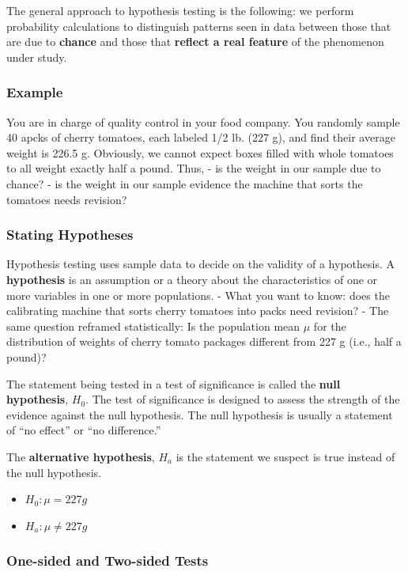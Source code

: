 \documentclass[
  openany]{book}
\providecommand{\tightlist}{%
  \setlength{\itemsep}{0pt}\setlength{\parskip}{0pt}}
\begin{document}
The general approach to hypothesis testing is the following: we perform probability calculations to distinguish patterns seen in data between those that are due to \textbf{chance} and those that \textbf{reflect a real feature} of the phenomenon under study.

\subsubsection{Example}\label{example-1}

You are in charge of quality control in your food company. You randomly sample 40 apcks of cherry tomatoes, each labeled 1/2 lb. (227 g), and find their average weight is 226.5 g. Obviously, we cannot expect boxes filled with whole tomatoes to all weight exactly half a pound. Thus, - is the weight in our sample due to chance? - is the weight in our sample evidence the machine that sorts the tomatoes needs revision?

\subsubsection{Stating Hypotheses}\label{stating-hypotheses}

Hypothesis testing uses sample data to decide on the validity of a hypothesis. A \textbf{hypothesis} is an assumption or a theory about the characteristics of one or more variables in one or more populations. - What you want to know: does the calibrating machine that sorts cherry tomatoes into packs need revision? - The same question reframed statistically: Is the population mean \(\mu\) for the distribution of weights of cherry tomato packages different from 227 g (i.e., half a pound)?

The statement being tested in a test of significance is called the \textbf{null hypothesis}, \(H_0\). The test of significance is designed to assess the strength of the evidence against the null hypothesis. The null hypothesis is usually a statement of ``no effect'' or ``no difference.''

The \textbf{alternative hypothesis}, \(H_a\) is the statement we suspect is true instead of the null hypothesis.

\begin{itemize}
\tightlist
\item
  \(H_0: \mu=227g\)
\item
  \(H_a: \mu\ne227g\)
\end{itemize}

\subsubsection{One-sided and Two-sided Tests}\label{one-sided-and-two-sided-tests}
\end{document}
